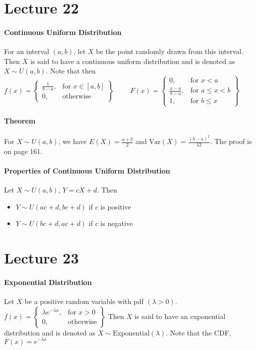 \documentclass[10pt,letter]{article}
\begin{document}
\section*{Lecture 22}
\paragraph{Continuous Uniform Distribution}
For an interval $(a,b)$, let $X$ be the point randomly drawn from this interval. Then $X$ is said to have a continuous uniform distribution and is denoted as $X\sim U(a,b)$. Note that then\\ 
$f(x)= \left.
\begin{cases}
\frac{1}{b-a}, & \text{for } x\in[a,b] \\ 
0, & \text{otherwise}
\end{cases}\right\}\quad\quad$
$F(x)=\left.
\begin{cases}
0, & \text{for }x<a\\ 
\frac{x-a}{b-a}, & \text{for }a\leq x<b\\
1, & \text{for }b\leq x
\end{cases}\right\}$

\paragraph{Theorem}
For $X\sim U(a,b)$, we have $E(X)=\frac{a+b}{2}$ and $\text{Var}(X)=\frac{(b-a)^2}{12}$. The proof is on page 161.

\paragraph{Properties of Continuous Uniform Distribution}
Let $X\sim U(a,b)$, $Y=cX+d$. Then \begin{itemize}
    \item $Y\sim U(ac+d,bc+d)$ if $c$ is positive 
    \item $Y\sim U(bc+d,ac+d)$ if $c$ is negative
\end{itemize} 

\section*{Lecture 23}
\paragraph{Exponential Distribution}
Let $X$ be a positive random variable with pdf $(\lambda>0)$. 
$f(x)=\left.
\begin{cases}
\lambda e^{-\lambda x}, & \text{for }x>0\\ 
0, & \text{otherwise}
\end{cases}\right\}$
Then $X$ is said to have an exponential distribution and is denoted as $X\sim \text{Exponential}(\lambda)$. Note that the CDF, $F(x)=e^{-\lambda x}$
\end{document}
